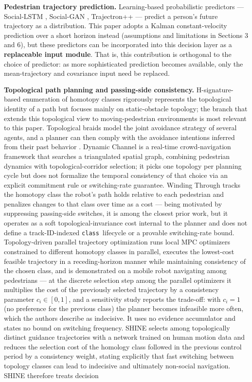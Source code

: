 \documentclass[11pt]{article}
\newcommand{\Class}{\texttt{class}}
\begin{document}
\textbf{Pedestrian trajectory prediction.} Learning-based probabilistic predictors --- Social-LSTM \cite{alahi2016sociallstm}, Social-GAN \cite{gupta2018socialgan}, Trajectron++ \cite{salzmann2020trajectron} --- predict a person's future trajectory as a distribution. This paper adopts a Kalman constant-velocity prediction over a short horizon instead (assumptions and limitations in Sections 3 and 6), but these predictors can be incorporated into this decision layer as a \textbf{replaceable input module}. That is, this contribution is orthogonal to the choice of predictor: as more sophisticated prediction becomes available, only the mean-trajectory and covariance input need be replaced.

\textbf{Topological path planning and passing-side consistency.} H-signature-based enumeration of homotopy classes \cite{bhattacharya2012topological} rigorously represents the topological identity of a path but focuses mainly on static-obstacle topology; the branch that extends this topological view to moving-pedestrian environments is most relevant to this paper. Topological braids model the joint avoidance strategy of several agents, and a planner can then comply with the avoidance intentions inferred from their past behavior \cite{mavrogiannis2019braids}. Dynamic Channel \cite{cao2019dynamicchannel} is a real-time crowd-navigation framework that searches a triangulated spatial graph, combining pedestrian dynamics with topological-corridor selection; it picks one topology per planning cycle but does not formalize the temporal consistency of that choice via an explicit commitment rule or switching-rate guarantee. Winding Through \cite{mavrogiannis2023winding} tracks the homotopy class the robot's path holds relative to each pedestrian and penalizes changes to that class over time as a cost --- being motivated by suppressing passing-side switches, it is among the closest prior work, but it operates as a soft topological-invariance cost internal to the planner and does not define a track-ID-indexed \Class\ lifecycle or a provable switching-rate bound. Topology-driven parallel trajectory optimization \cite{degroot2024topology} runs local MPC optimizers constrained to different homotopy classes in parallel, executes the lowest-cost feasible trajectory in a receding-horizon manner while maintaining consistency of the chosen class, and is demonstrated on a mobile robot navigating among pedestrians --- at the discrete selection step among the parallel optimizers it multiplies the cost of the previously selected trajectory by a consistency parameter $c_i \in [0,1]$, and a sensitivity study reports the trade-off: with $c_i = 1$ (no preference for the previous class) the planner becomes infeasible more often, which the authors describe as indecisive. It uses no evidence accumulator and states no bound on switching frequency. SHINE \cite{martinezbaselga2026shine} selects among topologically distinct guidance trajectories with a network trained on human motion data and reduces the selection cost of the homology class followed in the previous control period by a consistency weight, stating explicitly that fast switching between topology classes can lead to indecisive and ultimately non-social navigation. SHINE therefore treats decision 
\end{document}
